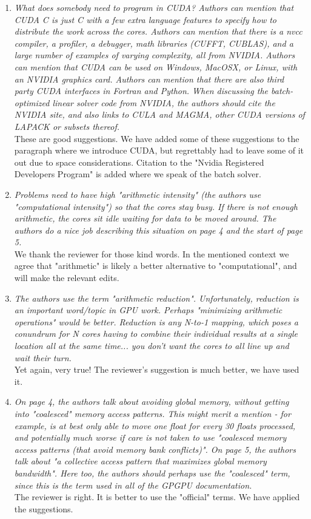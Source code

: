 \documentclass[11pt]{article} %
\newcommand\1{\vec 1}
\newcommand\q[1]{\textit{#1}}
\newcommand\qi[1]{\item\q{#1}}
\newcommand\ans[1]{#1}
\newcommand\ai[1]{\\[.5\baselineskip]\ans{#1}}
\begin{document}
\begin{enumerate}
\qi{What does somebody need to program in CUDA? Authors can mention that CUDA C is just C with a few extra language features to specify how to distribute the work across the cores. Authors can mention that there is a nvcc compiler, a profiler, a debugger, math libraries (CUFFT, CUBLAS), and a large number of examples of varying complexity, all from NVIDIA. Authors can mention that CUDA can be used on Windows, MacOSX, or Linux, with an NVIDIA graphics card. Authors can mention that there are also third party CUDA interfaces in Fortran and Python. When discussing the batch-optimized linear solver code from NVIDIA, the authors should cite the NVIDIA site, and also links to CULA and MAGMA, other CUDA versions of LAPACK or subsets thereof.}
\ai{These are good suggestions. We have added some of these suggestions to the paragraph where we introduce CUDA, but regrettably had to leave some of it out due to space considerations. Citation to the "Nvidia Registered Developers Program" is added where we speak of the batch solver.}
%
\qi{Problems need to have high "arithmetic intensity" (the authors use "computational intensity") so that the cores stay busy. If there is not enough arithmetic, the cores sit idle waiting for data to be moved around. The authors do a nice job describing this situation on page 4 and the start of page 5.}
\ai{We thank the reviewer for those kind words. In the mentioned context we agree that "arithmetic" is likely a better alternative to "computational", and will make the relevant edits.}
%
\qi{The authors use the term "arithmetic reduction". Unfortunately, reduction is an important word/topic in GPU work. Perhaps "minimizing arithmetic operations" would be better. Reduction is any N-to-1 mapping, which poses a conundrum for N cores having to combine their individual results at a single location all at the same time... you don't want the cores to all line up and wait their turn.}
\ai{Yet again, very true! The reviewer's suggestion is much better, we have used it.}
%
\qi{On page 4, the authors talk about avoiding global memory, without getting into "coalesced" memory access patterns. This might merit a mention - for example, is at best only able to move one float for every 30 floats processed, and potentially much worse if care is not taken to use "coalesced memory access patterns (that avoid memory bank conflicts)". On page 5, the authors talk about "a collective access pattern that maximizes global memory bandwidth". Here too, the authors should perhaps use the "coalesced" term, since this is the term used in all of the GPGPU documentation.}
\ai{The reviewer is right. It is better to use the "official" terms. We have applied the suggestions.}
\end{enumerate}
\end{document}
